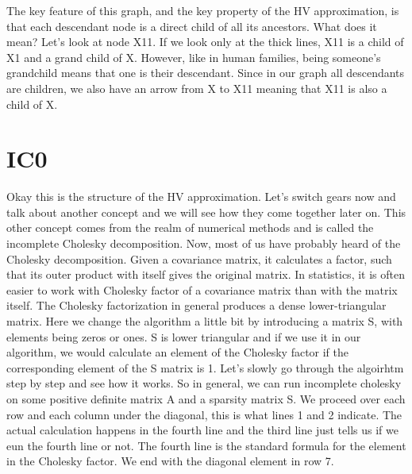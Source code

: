 \documentclass[12pt]{article} %
\begin{document}
The key feature of this graph, and the key property of the HV approximation, is that each descendant node is a direct child of all its ancestors. What does it mean? Let's look at node X11. If we look only at the thick lines, X11 is a child of X1 and a grand child of X. However, like in human families, being someone's grandchild means that one is their descendant. Since in our graph all descendants are children, we also have an arrow from X to X11 meaning that X11 is also a child of X.



\newpage
\section*{IC0}



Okay this is the structure of the HV approximation. Let's switch gears now and talk about another concept and we will see how they come together later on. This other concept comes from the realm of numerical methods and is called the incomplete Cholesky decomposition. Now, most of us have probably heard of the Cholesky decomposition. Given a covariance matrix, it calculates a factor, such that its outer product with itself gives the original matrix. In statistics, it is often easier to work with Cholesky factor of a covariance matrix than with the matrix itself. The Cholesky factorization in general produces a dense lower-triangular matrix. Here we change the algorithm a little bit by introducing a matrix S, with elements being zeros or ones. S is lower triangular and if we use it in our algorithm, we would calculate an element of the Cholesky factor if the corresponding element of the S matrix is 1. Let's slowly go through the algoirhtm step by step and see how it works. So in general, we can run incomplete cholesky on some positive definite matrix A and a sparsity matrix S. We proceed over each row and each column under the diagonal, this is what lines 1 and 2 indicate. The actual calculation happens in the fourth line and the third line just tells us if we eun the fourth line or not. The fourth line is the standard formula for the element in the Cholesky factor. We end with the diagonal element in row 7.
\newpage
\end{document}
